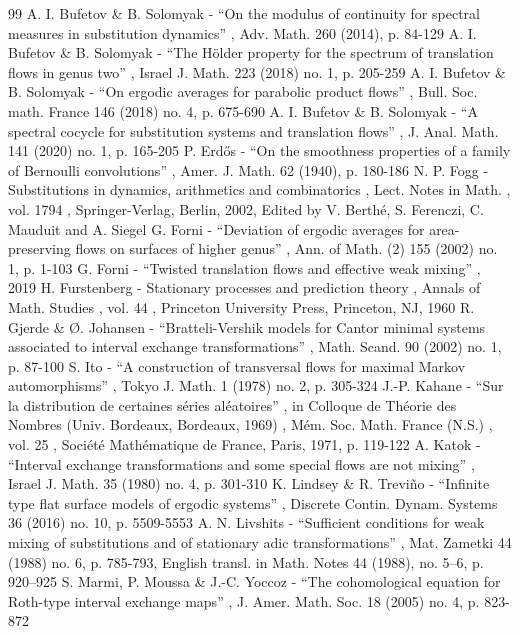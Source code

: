 \documentclass[11pt]{article}
\numberwithin{equation}{section}\newcommand{\Relation}[2][]{}\newtheorem*{prop*}{Proposition}
\begin{document}
\begin{thebibliography}{99}
 A. I. Bufetov \& B. Solomyak - “On the modulus of continuity for spectral measures in substitution dynamics” , Adv. Math. 260 (2014), p. 84-129
 A. I. Bufetov \& B. Solomyak - “The Hölder property for the spectrum of translation flows in genus two” , Israel J. Math. 223 (2018) no. 1, p. 205-259
 A. I. Bufetov \& B. Solomyak - “On ergodic averages for parabolic product flows” , Bull. Soc. math. France 146 (2018) no. 4, p. 675-690
 A. I. Bufetov \& B. Solomyak - “A spectral cocycle for substitution systems and translation flows” , J. Anal. Math. 141 (2020) no. 1, p. 165-205
 P. Erdős - “On the smoothness properties of a family of Bernoulli convolutions” , Amer. J. Math. 62 (1940), p. 180-186
 N. P. Fogg - Substitutions in dynamics, arithmetics and combinatorics , Lect. Notes in Math. , vol. 1794 , Springer-Verlag, Berlin, 2002, Edited by V. Berthé, S. Ferenczi, C. Mauduit and A. Siegel
 G. Forni - “Deviation of ergodic averages for area-preserving flows on surfaces of higher genus” , Ann. of Math. (2) 155 (2002) no. 1, p. 1-103
 G. Forni - “Twisted translation flows and effective weak mixing” , 2019
 H. Furstenberg - Stationary processes and prediction theory , Annals of Math. Studies , vol. 44 , Princeton University Press, Princeton, NJ, 1960
 R. Gjerde \& Ø. Johansen - “Bratteli-Vershik models for Cantor minimal systems associated to interval exchange transformations” , Math. Scand. 90 (2002) no. 1, p. 87-100
 S. Ito - “A construction of transversal flows for maximal Markov automorphisms” , Tokyo J. Math. 1 (1978) no. 2, p. 305-324
 J.-P. Kahane - “Sur la distribution de certaines séries aléatoires” , in Colloque de Théorie des Nombres (Univ. Bordeaux, Bordeaux, 1969) , Mém. Soc. Math. France (N.S.) , vol. 25 , Société Mathématique de France, Paris, 1971, p. 119-122
 A. Katok - “Interval exchange transformations and some special flows are not mixing” , Israel J. Math. 35 (1980) no. 4, p. 301-310
 K. Lindsey \& R. Treviño - “Infinite type flat surface models of ergodic systems” , Discrete Contin. Dynam. Systems 36 (2016) no. 10, p. 5509-5553
 A. N. Livshits - “Sufficient conditions for weak mixing of substitutions and of stationary adic transformations” , Mat. Zametki 44 (1988) no. 6, p. 785-793, English transl. in Math. Notes 44 (1988), no. 5–6, p. 920–925
 S. Marmi, P. Moussa \& J.-C. Yoccoz - “The cohomological equation for Roth-type interval exchange maps” , J. Amer. Math. Soc. 18 (2005) no. 4, p. 823-872

\end{thebibliography}
\end{document}
